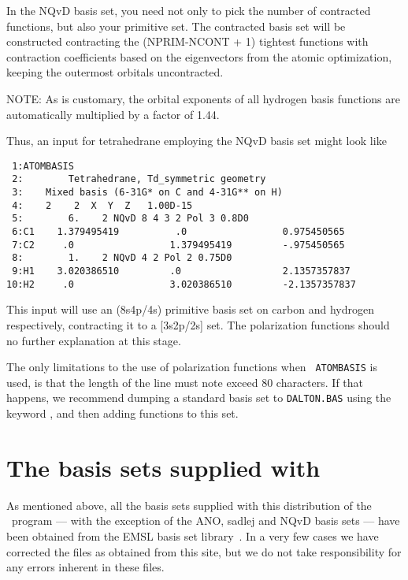 In the NQvD basis set, you need not only to pick the number of
contracted functions, but also your primitive set. The contracted
basis set will be constructed contracting the (NPRIM-NCONT + 1)
tightest functions with contraction coefficients based on the
eigenvectors from the atomic optimization, keeping the outermost
orbitals uncontracted.

NOTE: As is customary, the orbital exponents of all hydrogen basis
functions are automatically multiplied by a factor of 1.44.

Thus, an input for tetrahedrane employing the NQvD basis set might
look like

\begin{verbatim}
 1:ATOMBASIS
 2:        Tetrahedrane, Td_symmetric geometry
 3:    Mixed basis (6-31G* on C and 4-31G** on H)
 4:    2    2  X  Y  Z   1.00D-15
 5:        6.    2 NQvD 8 4 3 2 Pol 3 0.8D0
 6:C1    1.379495419          .0                 0.975450565
 7:C2     .0                 1.379495419         -.975450565
 8:        1.    2 NQvD 4 2 Pol 2 0.75D0
 9:H1    3.020386510         .0                  2.1357357837
10:H2     .0                 3.020386510         -2.1357357837
\end{verbatim}

This input will use an (8s4p/4s) primitive basis set on carbon and
hydrogen respectively, contracting it to a [3s2p/2s] set. The
polarization functions should no further explanation at this
stage. 

The only limitations to the use of polarization functions when {\tt
ATOMBASIS} is used, is that the length of the line must note exceed 80
characters. If that happens, we recommend dumping a standard basis set
to \verb|DALTON.BAS| using the keyword , and then adding
functions to this set.

\section{The basis sets supplied with \siraba }

As mentioned above, all the basis sets supplied with this distribution
of the \siraba\ program --- with the exception of the ANO,
sadlej and NQvD basis sets --- have been obtained from the EMSL basis set
library~\cite{emslref}. In a very few cases we have corrected the
files as obtained from this site, but we do not take responsibility
for any errors inherent in these files.

